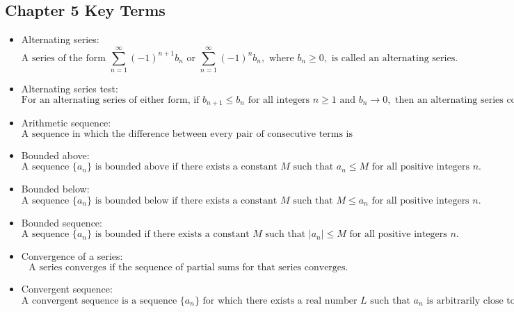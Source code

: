 \documentclass{report}
\begin{document}
    \subsection{\LARGE Chapter 5 Key Terms}
    \bigbreak \noindent 
    \begin{itemize}
    
    \item Alternating series: 
    \[
    \text{A series of the form } \sum_{n=1}^{\infty} (-1)^{n+1} b_n \text{ or } \sum_{n=1}^{\infty} (-1)^n b_n, \text{ where } b_n \geq 0, \text{ is called an alternating series.}
    \]
    
    \item Alternating series test: 
    \[
    \text{For an alternating series of either form, if } b_{n+1} \leq b_n \text{ for all integers } n \geq 1 \text{ and } b_n \to 0, \text{ then an alternating series converges.}
    \]
    
    \item Arithmetic sequence: 
    \[
    \text{A sequence in which the difference between every pair of consecutive terms is the same is called an arithmetic sequence.}
    \]
    
    \item Bounded above: 
    \[
    \text{A sequence } \{a_n\} \text{ is bounded above if there exists a constant } M \text{ such that } a_n \leq M \text{ for all positive integers } n.
    \]
    
    \item Bounded below: 
    \[
    \text{A sequence } \{a_n\} \text{ is bounded below if there exists a constant } M \text{ such that } M \leq a_n \text{ for all positive integers } n.
    \]
    
    \item Bounded sequence: 
    \[
    \text{A sequence } \{a_n\} \text{ is bounded if there exists a constant } M \text{ such that } |a_n| \leq M \text{ for all positive integers } n.
    \]
    
    
    \item Convergence of a series: 
    \[
    \text{A series converges if the sequence of partial sums for that series converges.}
    \]
    
    \item Convergent sequence: 
    \[
    \text{A convergent sequence is a sequence } \{a_n\} \text{ for which there exists a real number } L \text{ such that } a_n \text{ is arbitrarily close to } L \text{ as long as } n \text{ is sufficiently large.}
    \]
    

\end{itemize}
\end{document}
